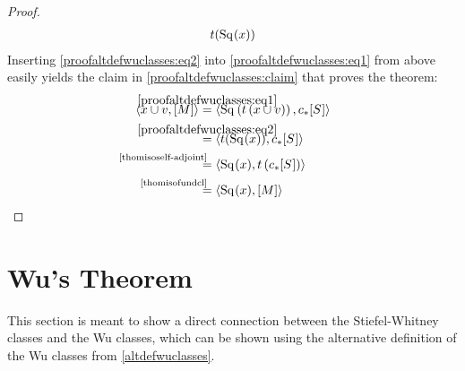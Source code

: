 \begin{Thm}
\begin{proof}
\begin{align}
        t(\mathrm{Sq}^{}(x))
    \end{align}
    Inserting \eqref{proofaltdefwuclasses:eq2} into
    \eqref{proofaltdefwuclasses:eq1} from above easily yields the
    claim in \eqref{proofaltdefwuclasses:claim} that proves the theorem:
    \begin{align*}
      \capped{x\cup \v}{\fundcl M}
      &\overset{\mathclap{\eqref{proofaltdefwuclasses:eq1}}}=
        \capped
        {\Sq{}\left(\thomiso\left(x\cup\v\right)\right)}
        {\pf\collapse\fundcl{\Sphere{}}}
      \\
      &\overset{\mathclap{\eqref{proofaltdefwuclasses:eq2}}}=
        \capped
        {\thomiso(\Sq{}(x))}
        {\pf\collapse\fundcl{\Sphere{}}}
      \\
      &\equalsby{\autoref{thomisoself-adjoint}}
        \capped
        {\Sq{}(x)}
        {\thomiso\left(\pf\collapse\fundcl{\Sphere{}}\right)}
      \\
      &\equalsby{\autoref{thomisofundcl}}
        \capped
        {\Sq{}(x)}
        {\fundcl M}
        \qedhere
    \end{align*}
  \end{proof}
\end{Thm}


\section[Wu's Theorem]{Wu's Theorem}
This section is meant to show a direct connection between the
Stiefel-Whitney classes and the Wu classes, which can be shown using
the alternative definition of the Wu classes from
\autoref{altdefwuclasses}.

